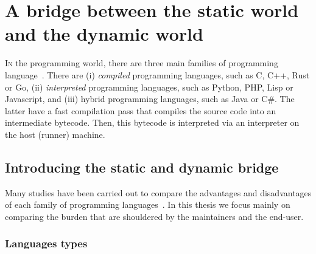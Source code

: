 \chapter{A bridge between the static world and the dynamic world}
\label{chap:static_dynamic_bridge}

\lettrine[lines=2]{I}{n} the programming world, there are three main families of programming
language~\parencite{prechelt.2000.comparison}. There are (i) \emph{compiled} programming languages, such as C, C++, Rust
or Go, (ii) \emph{interpreted} programming languages, such as Python, PHP, Lisp or Javascript, and (iii) hybrid
programming languages, such as Java or C\#. The latter have a fast compilation pass that compiles the source code into
an intermediate bytecode. Then, this bytecode is interpreted via an interpreter on the host (runner) machine.


\section{Introducing the static and dynamic bridge}

Many studies have been carried out to compare the advantages and disadvantages of each family of programming
languages~\parencite{boehm.1984.economics}. In this thesis we focus mainly on comparing the burden that are shouldered
by the maintainers and the end-user.


\subsection{Languages types}
\label{subsec:languages.types}


